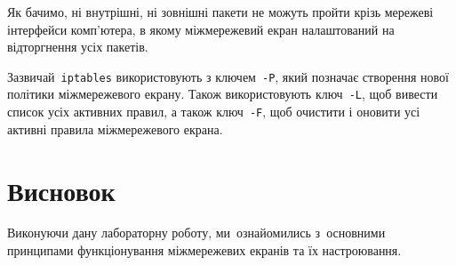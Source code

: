 \documentclass[
	a4paper,
	oneside,
	BCOR = 10mm,
	DIV = 12,
	12pt,
	headings = normal,
]{scrartcl}
\newcommand{\progname}[1]{\texttt{#1}}
\begin{document}
		Як бачимо, ні внутрішні, ні зовнішні пакети не можуть пройти крізь мережеві інтерфейси комп'ютера, в якому міжмережевий екран налаштований на відторгнення усіх пакетів.

		Зазвичай~\progname{\textenglish{iptables}} використовують з ключем~\verb|-P|, який позначає створення нової політики міжмережевого екрану. Також використовують ключ~\verb|-L|, щоб вивести список усіх активних правил, а також ключ~\verb|-F|, щоб очистити і оновити усі активні правила міжмережевого екрана.

	\section{Висновок}
		Виконуючи дану лабораторну роботу, ми~ознайомились з~основними принципами функціонування міжмережевих екранів та їх настроювання.
\end{document}
